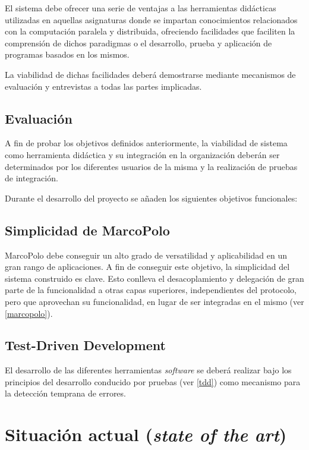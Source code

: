 El sistema debe ofrecer una serie de ventajas a las herramientas didácticas utilizadas en aquellas asignaturas donde se impartan conocimientos relacionados con la computación paralela y distribuida, ofreciendo facilidades que faciliten la comprensión de dichos paradigmas o el desarrollo, prueba y aplicación de programas basados en los mismos.

La viabilidad de dichas facilidades deberá demostrarse mediante mecanismos de evaluación y entrevistas a todas las partes implicadas.

\subsection{Evaluación}

A fin de probar los objetivos definidos anteriormente, la viabilidad de sistema como herramienta didáctica y su integración en la organización deberán ser determinados por los diferentes usuarios de la misma y la realización de pruebas de integración.

Durante el desarrollo del proyecto se añaden los siguientes objetivos funcionales:

\subsection{Simplicidad de MarcoPolo}

MarcoPolo debe conseguir un alto grado de versatilidad y aplicabilidad en un gran rango de aplicaciones. A fin de conseguir este objetivo, la simplicidad del sistema construido es clave. Esto conlleva el desacoplamiento y delegación de gran parte de la funcionalidad a otras capas superiores, independientes del protocolo, pero que aprovechan su funcionalidad, en lugar de ser integradas en el mismo (ver \ref{marcopolo}).

\subsection{Test-Driven Development}

El desarrollo de las diferentes herramientas \textit{software} se deberá realizar bajo los principios del desarrollo conducido por pruebas (ver \ref{tdd}) como mecanismo para la detección temprana de errores.

\section{Situación actual (\textit{state of the art})}

